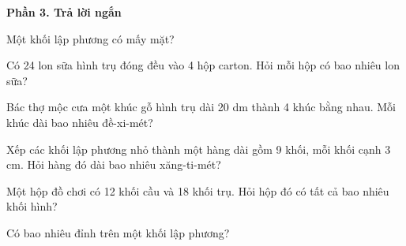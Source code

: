 \textbf{Phần 3. Trả lời ngắn}

\begin{ex} %
Một khối lập phương có mấy mặt?
\end{ex}

\begin{ex} %
Có 24 lon sữa hình trụ đóng đều vào 4 hộp carton. Hỏi mỗi hộp có bao nhiêu lon sữa?
\end{ex}

\begin{ex} %
Bác thợ mộc cưa một khúc gỗ hình trụ dài 20 dm thành 4 khúc bằng nhau. Mỗi khúc dài bao nhiêu đề-xi-mét?
\end{ex}

\begin{ex} %
Xếp các khối lập phương nhỏ thành một hàng dài gồm 9 khối, mỗi khối cạnh 3 cm. Hỏi hàng đó dài bao nhiêu xăng-ti-mét?
\end{ex}

\begin{ex} %
Một hộp đồ chơi có 12 khối cầu và 18 khối trụ. Hỏi hộp đó có tất cả bao nhiêu khối hình?
\end{ex}

\begin{ex} %
Có bao nhiêu đỉnh trên một khối lập phương?
\end{ex}
